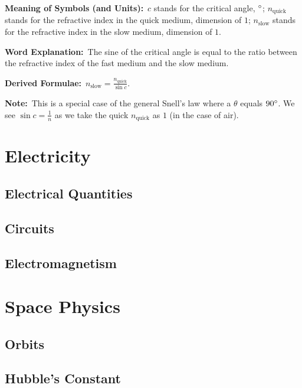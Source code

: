 \documentclass[8pt]{article}
\newcommand{\MeanSymb}{\textbf{Meaning of Symbols (and Units):}\ }
\newcommand{\WordExpl}{\textbf{Word Explanation:}\ }
\newcommand{\DeriForm}{\textbf{Derived Formulae:}\ }
\newcommand{\Note}{\textbf{Note:}\ }
\begin{document}
\begin{enumerate}
                \MeanSymb \(c\) stands for the critical angle, \(^\circ\); \(n_{\text{quick}}\) stands for the refractive index in the quick medium, dimension of \(1\); \(n_{\text{slow}}\) stands for the refractive index in the slow medium, dimension of \(1\).

                \WordExpl The sine of the critical angle is equal to the ratio between the refractive index of the fast medium and the slow medium.

                \DeriForm \(n_{\text{slow}} = \frac{n_{\text{quick}}}{\sin c}\).

                \Note This is a special case of the general Snell's law where a \(\theta\) equals \(90 ^\circ\). We see \(\sin c = \frac{1}{n}\) as we take the quick \(n_{\text{quick}}\) as \(1\) (in the case of air).
            \end{enumerate}

    \section{Electricity}
        \subsection{Electrical Quantities}

        \subsection{Circuits}

        \subsection{Electromagnetism}

    \section{Space Physics}
        \subsection{Orbits}

        \subsection{Hubble's Constant}
\end{document}
